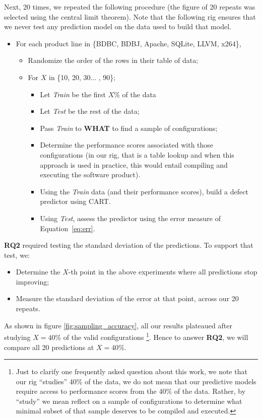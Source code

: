\documentclass{sig-alternative}
\newcommand{\bi}{\begin{itemize}}%
\newcommand{\ei}{\end{itemize}}
\newcommand{\eq}[1]{Equation~\ref{eq:#1}}
\newcommand{\what}{{\bf WHAT }}
\begin{document}
Next, 20 times, we repeated the following procedure (the figure of 20 repeats was
selected using the central limit theorem). Note that the following rig ensures that
we never test any prediction model on the data used to build that model.
\bi
\item For each  product line in \{BDBC, BDBJ, Apache, SQLite, LLVM, x264\},
\bi
\item Randomize the order of the rows in their table of data;
\item For $X$ in \{10, 20, 30... , 90\};
\bi
\item Let {\em Train} be the first $X$\% of the data 
\item Let {\em Test} be the rest of the data;
\item Pass {\em Train} to \what to find a sample of configurations;
\item Determine the performance scores associated with those configurations (in our rig, that is a table lookup and when
this approach is used in practice, this would entail compiling and executing the software product).
\item Using the {\em Train}  data (and their performance scores), build a defect predictor using CART.
\item Using {\em Test}, assess the predictor using the error 
measure of \eq{err}.
\ei
\ei
\ei
{\bf RQ2} required testing the standard deviation of the predictions. To support that test, we:
\bi
\item Determine the $X$-th point in the above experiments where all predictions stop improving;
\item Measure the standard deviation of the error at that point, across our 20 repeats.
\ei
As shown in figure \ref{fig:sampling_accuracy}, all our results plateaued after studying $X=40$\% of the valid configurations
 \footnote{Just to clarify one frequently asked question about this work, we note
that our rig ``studies'' 40\% of the data, we do not mean that our predictive models
 require access to performance scores from the 40\% of the data. Rather, by ``study'' we mean   reflect 
 on a sample of configurations to determine what minimal subset of that
sample deserves to be compiled and executed.}.
 Hence to answer {\bf RQ2}, we will compare all 20 predictions at $X=40$\%.
 
\end{document}
